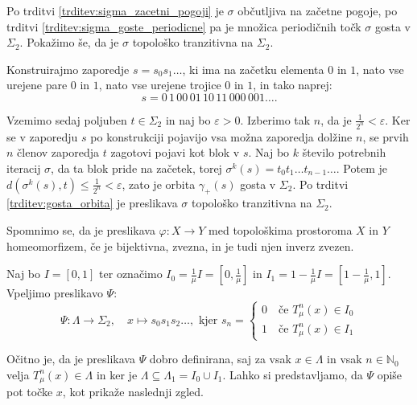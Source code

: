 \documentclass{isrmdelo}
\newcommand{\N}{\mathbb N}
\begin{document}
\begin{dokaz}
Po trditvi \ref{trditev:sigma_zacetni_pogoji} je $\sigma$ občutljiva na začetne pogoje, po trditvi \ref{trditev:sigma_goste_periodicne} pa je množica periodičnih točk $\sigma$ gosta v $\Sigma_2$. Pokažimo še, da je $\sigma$ topološko tranzitivna na $\Sigma_2$.

Konstruirajmo zaporedje $s = s_0 s_1 \dots$, ki ima na začetku elementa $0$ in $1$, nato vse urejene pare $0$ in $1$, nato vse urejene trojice $0$ in $1$, in tako naprej: $$ s = 0 \, 1 \, 00 \, 01 \, 10 \, 11 \, 000 \, 001 \dots .$$

Vzemimo sedaj poljuben $t \in \Sigma_2$ in naj bo $\varepsilon > 0$. Izberimo tak $n$, da je $\frac{1}{2^n} < \varepsilon$. Ker se v zaporedju $s$ po konstrukciji pojavijo vsa možna zaporedja dolžine $n$, se prvih $n$ členov zaporedja $t$ zagotovi pojavi kot blok v $s$. Naj bo $k$ število potrebnih iteracij $\sigma$, da ta blok pride na začetek, torej $\sigma^k(s) = t_0 t_1 \ldots t_{n-1} \ldots$. Potem je $d(\sigma^k(s), t) \leq \frac{1}{2^n} < \varepsilon$, zato je orbita $\gamma_{+}(s)$ gosta v $\Sigma_2$. Po trditvi \ref{trditev:gosta_orbita} je preslikava $\sigma$ topološko tranzitivna na $\Sigma_2$. \qedhere
\end{dokaz}

\bigskip

Spomnimo se, da je preslikava $\varphi: X \rightarrow Y$ med topološkima prostoroma $X$ in $Y$ homeomorfizem, če je bijektivna, zvezna, in je tudi njen inverz zvezen.

Naj bo $I=[0,1]$ ter označimo $I_0 = \frac{1}{\mu} I = [0, \frac{1}{\mu}]$ in  $I_1 = 1 - \frac{1}{\mu} I = [1 - \frac{1}{\mu}, 1]$. Vpeljimo preslikavo $\Psi$:
\begin{equation*}
    \Psi: \Lambda \rightarrow \Sigma_2, \quad x \mapsto s_0 s_1 s_2 \dots, \text{ kjer } s_n =
    \begin{cases}
        0 \quad \text{če } T_{\mu}^n(x) \in I_0 \\
        1 \quad \text{če } T_{\mu}^n(x) \in I_1
    \end{cases}
\end{equation*}

Očitno je, da je preslikava $\Psi$ dobro definirana, saj za vsak $x \in \Lambda$ in vsak $n \in \N_0$ velja $T_\mu^n(x) \in \Lambda$ in ker je $\Lambda \subseteq \Lambda_1 = I_0 \cup I_1$. Lahko si predstavljamo, da $\Psi$ opiše pot točke $x$, kot prikaže naslednji zgled.
\end{document}
